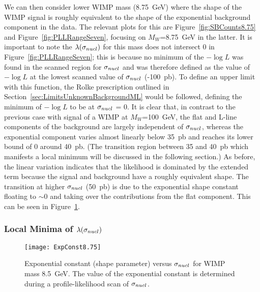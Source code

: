 We can then consider lower WIMP mass (8.75~GeV) where the shape of the WIMP signal is roughly equivalent to the shape of the exponential background component in the data.  The relevant plots for this are Figure~\ref{fig:SBCounts8.75} and Figure~\ref{fig:PLLRangeSeven}, focusing on $M_{W}$=8.75~GeV in the latter.  It is important to note the $\lambda(\sigma_{nucl})$ for this mass does not intersect 0 in Figure~\ref{fig:PLLRangeSeven}; this is because no minimum of the $-\log L$ was found in the scanned region for $\signuc$ and was therefore defined as the value of $-\log L$ at the lowest scanned value of $\signuc$ (-100~pb).  To define an upper limit with this function, the Rolke prescription outlined in Section~\ref{sec:LimitsUnknownBackgroundML} would be followed, defining the minimum of $-\log L$ to be at $\signuc$ = 0.  It is clear that, in contrast to the previous case with signal of a WIMP at $M_{W}$=100~GeV, the flat and L-line components of the background are largely independent of $\signuc$, whereas the exponential component varies almost linearly below 35~pb and reaches its lower bound of 0 around 40~pb.  (The transition region between 35 and 40~pb which manifests a local minimum will be discussed in the following section.)  As before, the linear variation indicates that the likelihood is dominated by the extended term because the signal and background have a roughly equivalent shape.  The transition at higher $\signuc$ (50~pb) is due to the exponential shape constant floating to  $\sim0$ and taking over the contributions from the flat component.  This can be seen in Figure~\ref{fig:FitExpoShapeVsSigma}.
	
		\subsubsection{Local Minima of \texorpdfstring{$\lambda(\sigma_{nucl})$}{Profile-likelihood Function}}
		\label{sec:LLPathoLocalMinima}
			
			\begin{figure}
				\centering
				\texttt{[image: ExpConst8.75]}
				\caption[Exponential constant (shape parameter) versus $\signuc$]
				{Exponential constant (shape parameter) versus $\signuc$ for WIMP mass 8.5~GeV.
				The value of the exponential constant is determined during a profile-likelihood scan
				of $\signuc$.}
				\label{fig:FitExpoShapeVsSigma}
			\end{figure}
	
